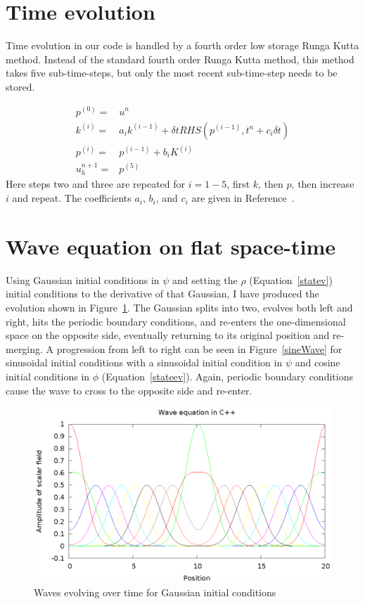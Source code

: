 \section{Time evolution}

Time evolution in our code is handled by a fourth order low storage Runga Kutta method. Instead of the standard fourth order Runga Kutta method, this method takes five sub-time-steps, but only the most recent sub-time-step needs to be stored.

\begin{eqnarray}
  p^{(0)}=&u^n\nonumber\\
  k^{(i)}=&a_ik^{(i-1)}+\delta t RHS(p^{(i-1)},t^n+c_i\delta t)\nonumber\\
  p^{(i)}=&p^{(i-1)}+b_iK^{(i)}\nonumber\\
  u_h^{n+1}=&p^{(5)}
\end{eqnarray}
Here steps two and three are repeated for $i=1-5$, first $k$, then $p$, then increase $i$ and repeat. The coefficients $a_i$, $b_i$, and $c_i$ are given in Reference~\cite{dghesthaven}.

\section{Wave equation on flat space-time}

Using Gaussian initial conditions in $\psi$ and setting the $\rho$ (Equation~\ref{statev}) initial conditions to the derivative of that Gaussian, I have produced the evolution shown in Figure~\ref{gaussWave}. The Gaussian splits into two, evolves both left and right, hits the periodic boundary conditions, and re-enters the one-dimensional space on the opposite side, eventually returning to its original position and re-merging. A progression from left to right can be seen in Figure~\ref{sineWave} for sinusoidal initial conditions with a sinusoidal initial condition in $\psi$ and cosine initial conditions in $\phi$ (Equation~\ref{stateev}). Again, periodic boundary conditions cause the wave to cross to the opposite side and re-enter.

\begin{figure}
  \includegraphics{gaussWave}
  \caption{Waves evolving over time for Gaussian initial conditions}
  \label{gaussWave}
\end{figure}

